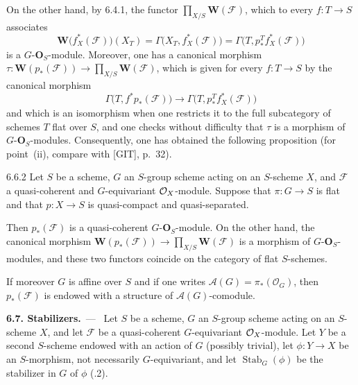 On the other hand, by 6.4.1, the functor
\(\prod_{X/S}\mathbf{W}(\mathcal{F})\), which to every \(f\colon T\to S\)
associates
\[
\mathbf{W}\bigl(f_{X}^{*}(\mathcal{F})\bigr)(X_{T})
  =\Gamma\bigl(X_{T},f_{X}^{*}(\mathcal{F})\bigr)
  =\Gamma\bigl(T,p^{T}_{*}f_{X}^{*}(\mathcal{F})\bigr)
\]
is a \(G\text{-}\mathbf{O}_{S}\)-module. Moreover, one has a canonical
morphism
\(\tau\colon\mathbf{W}(p_{*}(\mathcal{F}))\to\prod_{X/S}\mathbf{W}(\mathcal{F})\),
which is given for every \(f\colon T\to S\) by the canonical morphism
\[
\Gamma\bigl(T,f^{*}p_{*}(\mathcal{F})\bigr)
  \longrightarrow\Gamma\bigl(T,p^{T}_{*}f_{X}^{*}(\mathcal{F})\bigr)
\]
and which is an isomorphism when one restricts it to the full subcategory of
schemes \(T\) flat over \(S\), and one checks without difficulty that \(\tau\)
is a morphism of \(G\text{-}\mathbf{O}_{S}\)-modules. Consequently, one has
obtained the following proposition (for point~(ii), compare with [GIT],
p.~32).

\begin{proposition}{6.6.2}\label{I.6.6.2}
Let \(S\) be a scheme, \(G\) an \(S\)-group scheme acting on an \(S\)-scheme
\(X\), and \(\mathcal{F}\) a quasi-coherent and \(G\)-equivariant
\(\mathcal{O}_X\)-module. Suppose that \(\pi\colon G\to S\) is flat and that
\(p\colon X\to S\) is quasi-compact and quasi-separated.
\par
\begin{enumeratei}
\item Then \(p_{*}(\mathcal{F})\) is a quasi-coherent
\(G\text{-}\mathbf{O}_{S}\)-module. On the other hand, the canonical morphism
\(\mathbf{W}(p_{*}(\mathcal{F}))\to\prod_{X/S}\mathbf{W}(\mathcal{F})\) is a
morphism of \(G\text{-}\mathbf{O}_{S}\)-modules, and these two functors
coincide on the category of flat \(S\)-schemes.
\item If moreover \(G\) is affine over \(S\) and if one writes
\(\mathcal{A}(G)=\pi_{*}(\mathcal{O}_{G})\), then \(p_{*}(\mathcal{F})\) is
endowed with a structure of \(\mathcal{A}(G)\)-comodule.%
{\renewcommand{\thefootnote}{(55)}}
\end{enumeratei}
\end{proposition}

\par{}
\noindent\textbf{6.7. Stabilizers.}\ ---\ \label{I.sec.6.7}
Let \(S\) be a scheme, \(G\) an \(S\)-group scheme acting on an \(S\)-scheme
\(X\), and let \(\mathcal{F}\) be a quasi-coherent \(G\)-equivariant
\(\mathcal{O}_X\)-module. Let \(Y\) be a second \(S\)-scheme endowed with an action of
\(G\) (possibly trivial), let \(\phi\colon Y\to X\) be an \(S\)-morphism, not
necessarily \(G\)-equivariant, and let \(\operatorname{Stab}_{G}(\phi)\) be
the stabilizer in \(G\) of \(\phi\) (.2).

